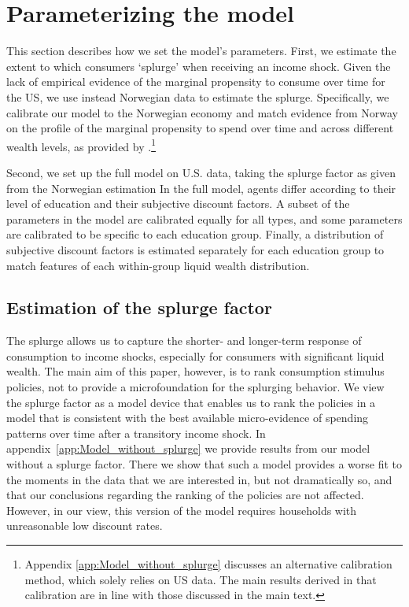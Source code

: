 \documentclass[\econtexRoot/HAFiscal]{subfiles}
\begin{document}
\hypertarget{parameterizing-the-model}{}\par\section{Parameterizing the model}
\notinsubfile{\label{sec:parameters}}

This section describes how we set the model's parameters. First, we estimate the extent to which consumers `splurge' when receiving an income shock. Given the lack of empirical evidence of the marginal propensity to consume over time for the US, we use instead Norwegian data to estimate the splurge. Specifically, we calibrate our model to the Norwegian economy and match evidence from Norway on the profile of the marginal propensity to spend over time and across different wealth levels, as provided by \citet{fagereng_mpc_2021}.\footnote{Appendix \ref{app:Model_without_splurge} discusses an alternative calibration method, which solely relies on US data. The main results derived in that calibration are in line with those discussed in the main text.} 

Second, we set up the full model on U.S. data, taking the splurge factor as given from the Norwegian estimation In the full model, agents differ according to their level of education and their subjective discount factors. A subset of the parameters in the model are calibrated equally for all types, and some parameters are calibrated to be specific to each education group. Finally, a distribution of subjective discount factors is estimated separately for each education group to match features of each within-group liquid wealth distribution.


\hypertarget{estimation-of-the-splurge-factor}{}\par\subsection{Estimation of the splurge factor}
\notinsubfile{\label{sec:splurge}}

The splurge allows us to capture the shorter- and longer-term response of consumption to income shocks, especially for consumers with significant liquid wealth. The main aim of this paper, however, is to rank consumption stimulus policies, not to provide a microfoundation for the splurging behavior. We view the splurge factor as a model device that enables us to rank the policies in a model that is consistent with the best available micro-evidence of spending patterns over time after a transitory income shock. In appendix~\ref{app:Model_without_splurge} we provide results from our model without a splurge factor. There we show that such a model provides a worse fit to the moments in the data that we are interested in, but not dramatically so, and that our conclusions regarding the ranking of the policies are not affected. However, in our view, this version of the model requires households with unreasonable low discount rates.
\end{document}
